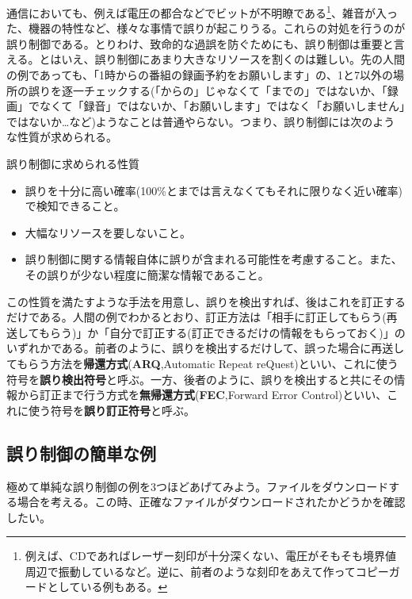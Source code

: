 通信においても、例えば電圧の都合などでビットが不明瞭である\footnote{例えば、CDであればレーザー刻印が十分深くない、電圧がそもそも境界値周辺で振動しているなど。逆に、前者のような刻印をあえて作ってコピーガードとしている例もある。}、雑音が入った、機器の特性など、様々な事情で誤りが起こりうる。これらの対処を行うのが誤り制御である。とりわけ、致命的な過誤を防ぐためにも、誤り制御は重要と言える。とはいえ、誤り制御にあまり大きなリソースを割くのは難しい。先の人間の例であっても、「1時からの番組の録画予約をお願いします」の、1と7以外の場所の誤りを逐一チェックする(「からの」じゃなくて「までの」ではないか、「録画」でなくて「録音」ではないか、「お願いします」ではなく「お願いしません」ではないか…など)ようなことは普通やらない。つまり、誤り制御には次のような性質が求められる。
\begin{itembox}[l]{誤り制御に求められる性質}
\begin{itemize}
\item 誤りを十分に高い確率(100\%とまでは言えなくてもそれに限りなく近い確率)で検知できること。
\item 大幅なリソースを要しないこと。
\item 誤り制御に関する情報自体に誤りが含まれる可能性を考慮すること。また、その誤りが少ない程度に簡潔な情報であること。
\end{itemize}
\end{itembox}

この性質を満たすような手法を用意し、誤りを検出すれば、後はこれを訂正するだけである。人間の例でわかるとおり、訂正方法は「相手に訂正してもらう(再送してもらう)」か「自分で訂正する(訂正できるだけの情報をもらっておく)」のいずれかである。前者のように、誤りを検出するだけして、誤った場合に再送してもらう方法を\textbf{帰還方式}(\textbf{ARQ},Automatic Repeat reQuest)といい、これに使う符号を\textbf{誤り検出符号}と呼ぶ。一方、後者のように、誤りを検出すると共にその情報から訂正まで行う方式を\textbf{無帰還方式}(\textbf{FEC},Forward Error Control)といい、これに使う符号を\textbf{誤り訂正符号}と呼ぶ。

\subsection{誤り制御の簡単な例}

極めて単純な誤り制御の例を3つほどあげてみよう。ファイルをダウンロードする場合を考える。この時、正確なファイルがダウンロードされたかどうかを確認したい。

